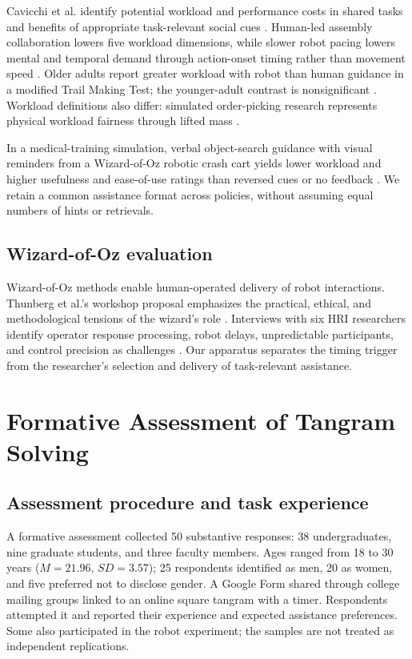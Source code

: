 \documentclass[sigconf,anonymous]{aamas}
\begin{document}
Cavicchi et al. identify potential workload and performance costs in shared tasks and benefits of appropriate task-relevant social cues \cite{cavicchi2025}. Human-led assembly collaboration lowers five workload dimensions, while slower robot pacing lowers mental and temporal demand through action-onset timing rather than movement speed \cite{vandijk2023}. Older adults report greater workload with robot than human guidance in a modified Trail Making Test; the younger-adult contrast is nonsignificant \cite{varrasi2026}. Workload definitions also differ: simulated order-picking research represents physical workload fairness through lifted mass \cite{smit2024}.

In a medical-training simulation, verbal object-search guidance with visual reminders from a Wizard-of-Oz robotic crash cart yields lower workload and higher usefulness and ease-of-use ratings than reversed cues or no feedback \cite{tanjim2025}. We retain a common assistance format across policies, without assuming equal numbers of hints or retrievals.

\subsection{Wizard-of-Oz evaluation}

Wizard-of-Oz methods enable human-operated delivery of robot interactions. Thunberg et al.'s workshop proposal emphasizes the practical, ethical, and methodological tensions of the wizard's role \cite{thunberg2026}. Interviews with six HRI researchers identify operator response processing, robot delays, unpredictable participants, and control precision as challenges \cite{bejarano2024}. Our apparatus separates the timing trigger from the researcher's selection and delivery of task-relevant assistance.

\section{Formative Assessment of Tangram Solving}

\subsection{Assessment procedure and task experience}
A formative assessment collected 50 substantive responses: 38 undergraduates, nine graduate students, and three faculty members. Ages ranged from 18 to 30 years ($M=21.96$, $SD=3.57$); 25 respondents identified as men, 20 as women, and five preferred not to disclose gender. A Google Form shared through college mailing groups linked to an online square tangram with a timer. Respondents attempted it and reported their experience and expected assistance preferences. Some also participated in the robot experiment; the samples are not treated as independent replications.
\end{document}
